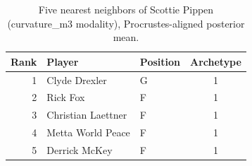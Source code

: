 \begin{table}[htbp]
  \centering\small
  \begin{tabular}{rllc}
    \toprule
    Rank & Player & Position & Archetype \\
    \midrule
    1 & Clyde Drexler & G & 1 \\
    2 & Rick Fox & F & 1 \\
    3 & Christian Laettner & F & 1 \\
    4 & Metta World Peace & F & 1 \\
    5 & Derrick McKey & F & 1 \\
    \bottomrule
  \end{tabular}
  \caption{Five nearest neighbors of Scottie Pippen (curvature_m3 modality), Procrustes-aligned posterior mean.}
  \label{tab:Scottie_Pippen_neighbors_curvature_m3}
\end{table}

